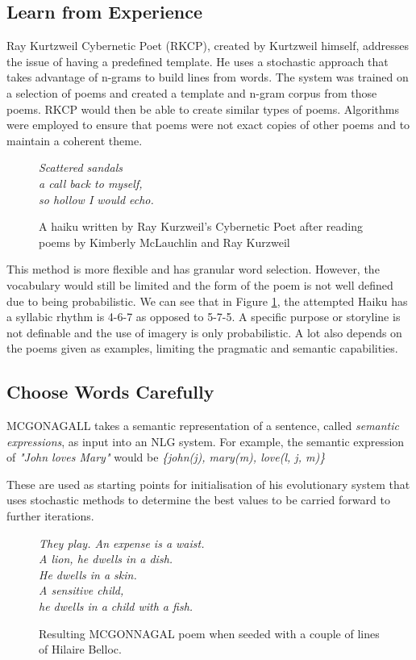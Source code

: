 \subsection{Learn from Experience}
\label{sec:RKCP}

Ray Kurtzweil Cybernetic Poet (RKCP), created by Kurtzweil himself\cite{kurzweil1999ray}, addresses the issue of having a predefined template. He uses a stochastic approach that takes advantage of n-grams to build lines from words. The system was trained on a selection of poems and created a template and n-gram corpus from those poems. RKCP would then be able to create similar types of poems. Algorithms were employed to ensure that poems were not exact copies of other poems and to maintain a coherent theme.

\begin{figure}[h!]
\centering
\textit{
Scattered sandals\\
a call back to myself,\\
so hollow I would echo.
}
\caption{A haiku written by Ray Kurzweil's Cybernetic Poet after reading poems by Kimberly McLauchlin and Ray Kurzweil}
\label{fig:rkcp}
\end{figure}

This method is more flexible and has granular word selection. However, the vocabulary would still be limited and the form of the poem is not well defined due to being probabilistic. We can see that in Figure \ref{fig:rkcp}, the attempted Haiku has a syllabic rhythm is 4-6-7 as opposed to 5-7-5. A specific purpose or storyline is not definable and the use of imagery is only probabilistic. A lot also depends on the poems given as examples, limiting the pragmatic and semantic capabilities.


\subsection{Choose Words Carefully}
\label{sec:mcg}
MCGONAGALL\cite{manurung2004evolutionary} takes a semantic representation of a sentence, called \textit{semantic expressions}, as input into an NLG system. For example, the semantic expression of \textit{"John loves Mary"} would be \textit{\{john(j), mary(m), love(l, j, m)\}}

These are used as starting points for initialisation of his evolutionary system that uses stochastic methods to determine the best values to be carried forward to further iterations.

\begin{figure}[h!]
\centering
\textit{
They play. An expense is a waist.\\
A lion, he dwells in a dish.\\
He dwells in a skin.\\
A sensitive child,\\
he dwells in a child with a fish.\\
}
\caption{Resulting MCGONNAGAL poem when seeded with a couple of lines of Hilaire Belloc.}
\label{fig:mcg}
\end{figure}

